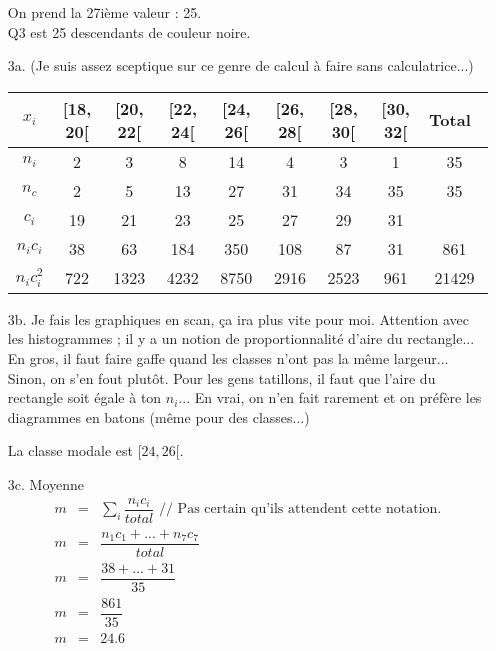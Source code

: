 \documentclass[11pt]{article}
\begin{document}
\begin{enumerate}
  On prend la 27ième valeur : 25.\\
  Q3 est 25 descendants de couleur noire.\\

  \item[3a.] (Je suis assez sceptique sur ce genre de calcul à faire sans calculatrice...)

  \begin{center}
    \begin{tabular}{|c||c|c|c|c|c|c|c||c|}
      \hline
      $x_i$ & [18, 20[ & [20, 22[ & [22, 24[ & [24, 26[ & [26, 28[& [28, 30[& [30, 32[ & Total \\
      \hline
      $n_i$ &        2 &        3 &        8 &      14  &       4 &       3 &       1  & 35  \\
      \hline
      $n_c$ &        2 &        5 &       13 &      27  &      31 &      34 &      35  & 35 \\ 
      \hline      
      $c_i$ &       19 &       21 &       23 &      25  &      27 &      29 &      31  &  \\ 
      \hline  
      $n_i c_i$ &   38 &       63 &      184 &     350  &     108 &      87 &      31  & 861 \\ 
      \hline  
      $n_i c_i^2$ & 722&     1323 &     4232 &     8750 &    2916 &    2523 &      961 & 21429 \\
      \hline   
    \end{tabular}
  \end{center}

  \item[3b.] Je fais les graphiques en scan, ça ira plus vite pour moi. Attention avec les histogrammes ; il y a un notion de proportionnalité d'aire du rectangle... En gros, il faut faire gaffe quand les classes n'ont pas la même largeur... Sinon, on s'en fout plutôt.
  Pour les gens tatillons, il faut que l'aire du rectangle soit égale à ton $n_i$...
  En vrai, on n'en fait rarement et on préfère les diagrammes en batons (même pour des classes...)

  La classe modale est $[24, 26[$.

  \item[3c.] 
  Moyenne
  \begin{eqnarray*}
    m &=& \sum_i \dfrac{n_i c_i}{total} \text{ // Pas certain qu'ils attendent cette notation.} \\
    m &=& \dfrac{n_1 c_1 + ... + n_7 c_7 }{total} \\
    m &=& \dfrac{38 + ... + 31}{35} \\
    m &=& \dfrac{861}{35} \\
    m &=& 24.6
  \end{eqnarray*}


\end{enumerate}
\end{document}

